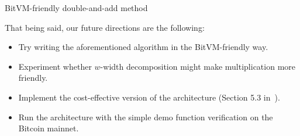 \documentclass{iacrtrans}
\begin{document}
\begin{algorithm}
  \caption{BitVM-friendly double-and-add method}\label{alg:double_and_add}


\end{algorithm}\label{alg:double_and_add_bitvm_friendly}

That being said, our future directions are the following:
\begin{itemize}
  \item Try writing the aforementioned algorithm in the BitVM-friendly way.
  \item Experiment whether $w$-width decomposition might make multiplication
    more friendly.
  \item Implement the cost-effective version of the architecture
    (Section 5.3 in~\cite{bitvm2}).
  \item Run the architecture with the simple demo function verification on the
    Bitcoin mainnet.
\end{itemize}

\printbibliography{}
\end{document}
